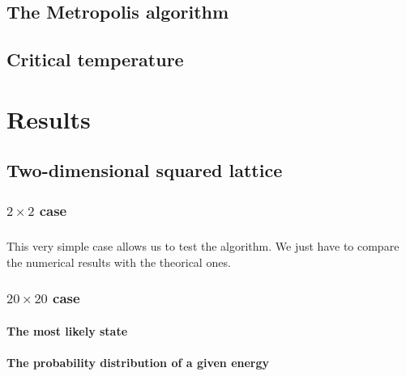\documentclass[a4paper, twoside, 11pt]{report}
\theoremstyle{theorem}
\theoremstyle{remark}
\theoremstyle{exemple}
\begin{document}
        \subsection{}
        
    \section{The Metropolis algorithm}
    
    \section{Critical temperature}



\chapter{Results}

    \section{Two-dimensional squared lattice}
    
        \subsection{$2\times2$ case}
        
            \paragraph{}This very simple case allows us to test the algorithm. We just have to compare the numerical results with the theorical ones.
            
        \subsection{$20\times20$ case}
        
            \subsubsection{The most likely state}
            
            \subsubsection{The probability distribution of a given energy}
    
\end{document}
